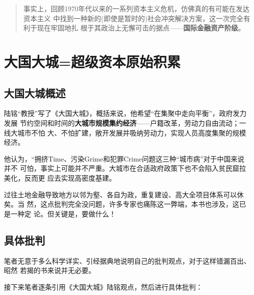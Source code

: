 \begin{quotation}
  事实上，回顾1970年代以来的一系列资本主义危机，仿佛真的有可能在发达资本主义
  中找到一种新的(即使是暂时的)社会冲突解决方案，这一次完全有利于现在牢固地扎
  根于其政治上无懈可击的据点——\textbf{国际金融资产阶级}。

\end{quotation}

\section{大国大城=超级资本原始积累}

\subsection{大国大城概述}

陆铭“教授”写了《大国大城》，概括来说，他希望“在集聚中走向平衡”，政府发力发展
节约空间和时间的\textbf{大城市规模集约经济}——户籍改革，劳动力自由流动；一线大城市不怕
大、不怕扩建，敞开发展并吸纳劳动力，实现人员高度集聚的规模经济。

他认为，“拥挤Time、污染Grime和犯罪Crime问题这三种“城市病”对于中国来说并不
可怕，事实上可能并不严重。大城市在合适政府政策下也不会陷入贫民窟拉美化，反而更
应去实现高密度基建。

过往土地金融导致地方以邻为壑、各自为政，重复建设、高大全项目体系可以休矣。当
然，这点批判完全没问题，许多专家也痛陈这一弊端，本书也涉及，这已是一种定
论。但关键是，要做什么！

\subsection{具体批判}

笔者无意于多么科学详实、引经据典地说明自己的批判观点，对于这样错漏百出、昭然
若揭的书来说并无必要。

接下来笔者逐条引用《大国大城》陆铭观点，然后进行具体批判：

